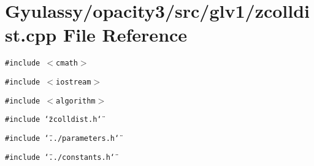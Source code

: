 \section{Gyulassy/opacity3/src/glv1/zcolldist.cpp File Reference}
\label{zcolldist_8cpp}
{\tt \#include $<$cmath$>$}\par
{\tt \#include $<$iostream$>$}\par
{\tt \#include $<$algorithm$>$}\par
{\tt \#include \char`\"{}zcolldist.h\char`\"{}}\par
{\tt \#include \char`\"{}../parameters.h\char`\"{}}\par
{\tt \#include \char`\"{}../constants.h\char`\"{}}\par
